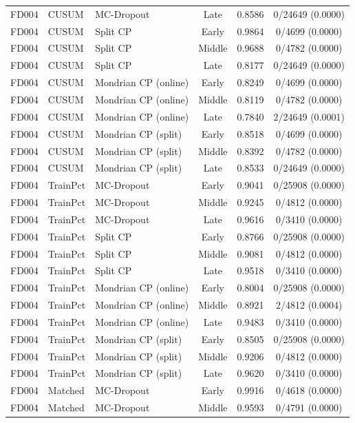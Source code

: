 \begin{table}[t]
\begin{tabular}{lllccc}
FD004 & CUSUM & MC-Dropout & Late & 0.8586 & 0/24649 (0.0000) \\
FD004 & CUSUM & Split CP & Early & 0.9864 & 0/4699 (0.0000) \\
FD004 & CUSUM & Split CP & Middle & 0.9688 & 0/4782 (0.0000) \\
FD004 & CUSUM & Split CP & Late & 0.8177 & 0/24649 (0.0000) \\
FD004 & CUSUM & Mondrian CP (online) & Early & 0.8249 & 0/4699 (0.0000) \\
FD004 & CUSUM & Mondrian CP (online) & Middle & 0.8119 & 0/4782 (0.0000) \\
FD004 & CUSUM & Mondrian CP (online) & Late & 0.7840 & 2/24649 (0.0001) \\
FD004 & CUSUM & Mondrian CP (split) & Early & 0.8518 & 0/4699 (0.0000) \\
FD004 & CUSUM & Mondrian CP (split) & Middle & 0.8392 & 0/4782 (0.0000) \\
FD004 & CUSUM & Mondrian CP (split) & Late & 0.8533 & 0/24649 (0.0000) \\
FD004 & TrainPct & MC-Dropout & Early & 0.9041 & 0/25908 (0.0000) \\
FD004 & TrainPct & MC-Dropout & Middle & 0.9245 & 0/4812 (0.0000) \\
FD004 & TrainPct & MC-Dropout & Late & 0.9616 & 0/3410 (0.0000) \\
FD004 & TrainPct & Split CP & Early & 0.8766 & 0/25908 (0.0000) \\
FD004 & TrainPct & Split CP & Middle & 0.9081 & 0/4812 (0.0000) \\
FD004 & TrainPct & Split CP & Late & 0.9518 & 0/3410 (0.0000) \\
FD004 & TrainPct & Mondrian CP (online) & Early & 0.8004 & 0/25908 (0.0000) \\
FD004 & TrainPct & Mondrian CP (online) & Middle & 0.8921 & 2/4812 (0.0004) \\
FD004 & TrainPct & Mondrian CP (online) & Late & 0.9483 & 0/3410 (0.0000) \\
FD004 & TrainPct & Mondrian CP (split) & Early & 0.8505 & 0/25908 (0.0000) \\
FD004 & TrainPct & Mondrian CP (split) & Middle & 0.9206 & 0/4812 (0.0000) \\
FD004 & TrainPct & Mondrian CP (split) & Late & 0.9620 & 0/3410 (0.0000) \\
FD004 & Matched & MC-Dropout & Early & 0.9916 & 0/4618 (0.0000) \\
FD004 & Matched & MC-Dropout & Middle & 0.9593 & 0/4791 (0.0000) \\

\end{tabular}
\end{table}
